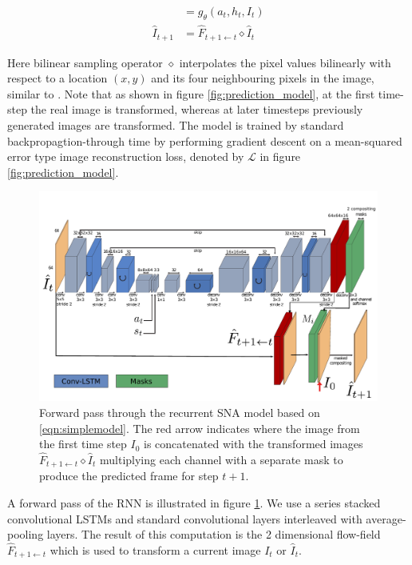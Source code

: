 \begin{align}
[h_{t+1}, \hat{F}_{t+1 \leftarrow t}] 	&= g_{\theta}(a_t, h_t, I_t) \\
\hat{I}_{t+1} 							&= \hat{F}_{t+1 \leftarrow t} \diamond  \hat{I}_t 
\label{simple_dna}
\end{align}

Here bilinear sampling operator $\diamond$ interpolates the pixel values bilinearly with respect to a location $(x,y)$ and its four neighbouring pixels in the image, similar to \cite{zhou2016view}. Note that as shown in figure \ref{fig:prediction_model}, at the first time-step the real image is transformed, whereas at later timesteps previously generated images are transformed. The model is trained by standard backpropagtion-through time by performing gradient descent on a mean-squared error type image reconstruction loss, denoted by $\mathcal{L}$ in figure \ref{fig:prediction_model}.
\begin{figure}[t]
    \centering
    \includegraphics[width=\columnwidth]{images_sna/occlusionaware/architecture.pdf}
    \caption{\small{Forward pass through the recurrent SNA model based on \autoref{eqn:simplemodel}. The red arrow indicates where the image from the first time step $I_0$ is concatenated with the transformed images $\hat{F}_{t+1 \leftarrow t} \diamond  \hat{I}_t $ multiplying each channel with a separate mask to produce the predicted frame for step $t+1$.}}      \label{fig:occlusion_model}
\end{figure}

\label{subsec:pixel_trafo}
A forward pass of the RNN is illustrated in figure \ref{fig:occlusion_model}. We use a series stacked convolutional LSTMs and standard convolutional layers interleaved with average-pooling layers. The result of this computation is the 2 dimensional flow-field $\hat{F}_{t+1 \leftarrow t}$ which is used to transform a current image $I_t$ or $\hat{I}_t$.

